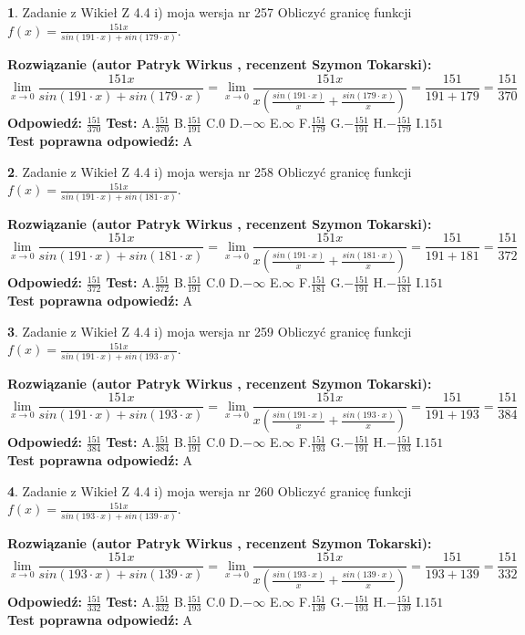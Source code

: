 \documentclass[12pt, a4paper]{article}
\theoremstyle{definition} %
\newtheorem{zad}{}
\newcommand{\zadStart}[1]{\begin{zad}#1\newline}
\newcommand{\zadStop}{\end{zad}}
\newcommand{\rozwStart}[2]{\noindent \textbf{Rozwiązanie (autor #1 , recenzent #2): }\newline}
\newcommand{\rozwStop}{\newline}
\newcommand{\odpStart}{\noindent \textbf{Odpowiedź:}\newline}
\newcommand{\odpStop}{\newline}
\newcommand{\testStart}{\noindent \textbf{Test:}\newline}
\newcommand{\testStop}{\newline}
\newcommand{\kluczStart}{\noindent \textbf{Test poprawna odpowiedź:}\newline}
\newcommand{\kluczStop}{\newline}
\begin{document}
\zadStart{Zadanie z Wikieł Z 4.4 i) moja wersja nr 257}
Obliczyć granicę funkcji $f(x)=\frac{151x}{sin(191\cdot x) +sin(179\cdot x)}$.
\zadStop
\rozwStart{Patryk Wirkus}{Szymon Tokarski}
$$\lim\limits_{x\to 0}\frac{151x}{sin(191\cdot x) +sin(179\cdot x)}=\lim\limits_{x\to 0}\frac{151x}{x(\frac{sin(191\cdot x)}{x}+\frac{sin(179\cdot x)}{x})}=\frac{151}{191+179} = \frac{151}{370}$$
\rozwStop
\odpStart
$\frac{151}{370}$
\odpStop
\testStart
A.$\frac{151}{370}$
B.$\frac{151}{191}$
C.$0$
D.$-\infty$
E.$\infty$
F.$\frac{151}{179}$
G.$-\frac{151}{191}$
H.$-\frac{151}{179}$
I.$151$
\testStop
\kluczStart
A
\kluczStop



\zadStart{Zadanie z Wikieł Z 4.4 i) moja wersja nr 258}
Obliczyć granicę funkcji $f(x)=\frac{151x}{sin(191\cdot x) +sin(181\cdot x)}$.
\zadStop
\rozwStart{Patryk Wirkus}{Szymon Tokarski}
$$\lim\limits_{x\to 0}\frac{151x}{sin(191\cdot x) +sin(181\cdot x)}=\lim\limits_{x\to 0}\frac{151x}{x(\frac{sin(191\cdot x)}{x}+\frac{sin(181\cdot x)}{x})}=\frac{151}{191+181} = \frac{151}{372}$$
\rozwStop
\odpStart
$\frac{151}{372}$
\odpStop
\testStart
A.$\frac{151}{372}$
B.$\frac{151}{191}$
C.$0$
D.$-\infty$
E.$\infty$
F.$\frac{151}{181}$
G.$-\frac{151}{191}$
H.$-\frac{151}{181}$
I.$151$
\testStop
\kluczStart
A
\kluczStop



\zadStart{Zadanie z Wikieł Z 4.4 i) moja wersja nr 259}
Obliczyć granicę funkcji $f(x)=\frac{151x}{sin(191\cdot x) +sin(193\cdot x)}$.
\zadStop
\rozwStart{Patryk Wirkus}{Szymon Tokarski}
$$\lim\limits_{x\to 0}\frac{151x}{sin(191\cdot x) +sin(193\cdot x)}=\lim\limits_{x\to 0}\frac{151x}{x(\frac{sin(191\cdot x)}{x}+\frac{sin(193\cdot x)}{x})}=\frac{151}{191+193} = \frac{151}{384}$$
\rozwStop
\odpStart
$\frac{151}{384}$
\odpStop
\testStart
A.$\frac{151}{384}$
B.$\frac{151}{191}$
C.$0$
D.$-\infty$
E.$\infty$
F.$\frac{151}{193}$
G.$-\frac{151}{191}$
H.$-\frac{151}{193}$
I.$151$
\testStop
\kluczStart
A
\kluczStop



\zadStart{Zadanie z Wikieł Z 4.4 i) moja wersja nr 260}
Obliczyć granicę funkcji $f(x)=\frac{151x}{sin(193\cdot x) +sin(139\cdot x)}$.
\zadStop
\rozwStart{Patryk Wirkus}{Szymon Tokarski}
$$\lim\limits_{x\to 0}\frac{151x}{sin(193\cdot x) +sin(139\cdot x)}=\lim\limits_{x\to 0}\frac{151x}{x(\frac{sin(193\cdot x)}{x}+\frac{sin(139\cdot x)}{x})}=\frac{151}{193+139} = \frac{151}{332}$$
\rozwStop
\odpStart
$\frac{151}{332}$
\odpStop
\testStart
A.$\frac{151}{332}$
B.$\frac{151}{193}$
C.$0$
D.$-\infty$
E.$\infty$
F.$\frac{151}{139}$
G.$-\frac{151}{193}$
H.$-\frac{151}{139}$
I.$151$
\testStop
\kluczStart
A
\kluczStop
\end{document}
